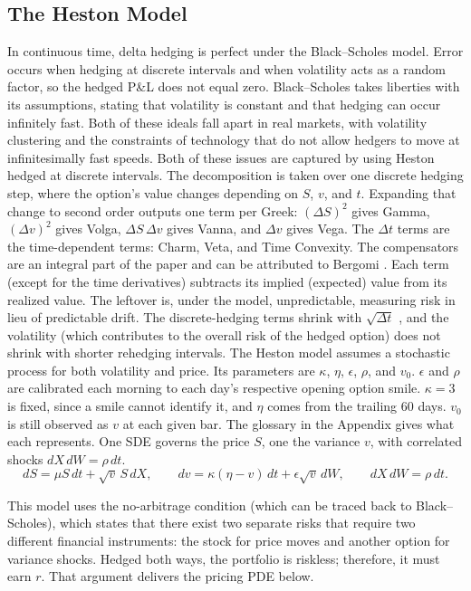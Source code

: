 \documentclass[11pt]{article}
\begin{document}
\subsection{The Heston Model}
\label{sec:heston}
In continuous time, delta hedging is perfect under the Black--Scholes model. Error occurs when hedging at discrete intervals and when volatility acts as a random factor, so the hedged P\&L does not equal zero. Black--Scholes takes liberties with its assumptions, stating that volatility is constant and that hedging can occur infinitely fast. Both of these ideals fall apart in real markets, with volatility clustering and the constraints of technology that do not allow hedgers to move at infinitesimally fast speeds. Both of these issues are captured by using Heston hedged at discrete intervals.
The decomposition is taken over one discrete hedging step, where the option's value changes depending on $S$, $v$, and $t$. Expanding that change to second order outputs one term per Greek: $(\Delta S)^2$ gives Gamma, $(\Delta v)^2$ gives Volga, $\Delta S\,\Delta v$ gives Vanna, and $\Delta v$ gives Vega. The $\Delta t$ terms are the time-dependent terms: Charm, Veta, and Time Convexity.
The compensators are an integral part of the paper and can be attributed to Bergomi \cite{bergomi2016}. Each term (except for the time derivatives) subtracts its implied (expected) value from its realized value. The leftover is, under the model, unpredictable, measuring risk in lieu of predictable drift.
The discrete-hedging terms shrink with $\sqrt{\Delta t}$ \cite{bertsimas2000}, and the volatility (which contributes to the overall risk of the hedged option) does not shrink with shorter rehedging intervals.
The Heston model assumes a stochastic process for both volatility and price. Its parameters are
$\kappa$, $\eta$, $\epsilon$, $\rho$, and $v_0$. $\epsilon$ and $\rho$ are calibrated each morning to each day's respective opening option smile. $\kappa = 3$ is fixed, since a smile cannot identify it, and $\eta$ comes from the trailing 60 days. $v_0$ is still observed as $v$ at each given bar.
The glossary in the Appendix gives what each represents. One SDE governs the price $S$, one the
variance $v$, with correlated shocks $dX\,dW = \rho\,dt$.
\[ dS = \mu S\,dt + \sqrt{v}\,S\,dX, \qquad dv = \kappa(\eta - v)\,dt + \epsilon \sqrt{v}\,dW, \qquad dX\,dW = \rho\,dt .
\]

This model uses the no-arbitrage condition \cite{gatheral2006} (which can be traced back to Black--Scholes), which states that there exist two separate risks that require two different financial instruments: the stock for price moves and another option for variance shocks. Hedged both ways, the portfolio is riskless; therefore, it must earn $r$.
That argument delivers the pricing PDE below.
\end{document}
